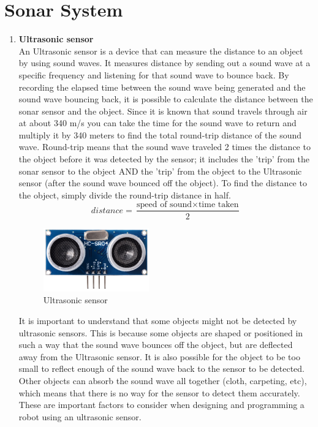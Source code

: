 \section{Sonar System}
	\begin{enumerate}
		\item \textbf{Ultrasonic sensor}\\
		An Ultrasonic sensor is a device that can measure the distance to an object by using sound waves. 
		It measures distance by sending out a sound wave at a specific frequency and listening for that sound wave to bounce back. 
		By recording the elapsed time between the sound wave being generated and the sound wave bouncing back, it is possible to calculate the distance between the sonar sensor and the object.
		Since it is known that sound travels through air at about 340 m/s you can take the time for the sound wave to return and multiply it by 340 meters to find the total round-trip distance of the sound wave. 
		Round-trip means that the sound wave traveled 2 times the distance to the object before it was detected by the sensor; it includes the 'trip' from the sonar sensor to the object AND the 'trip' from the object to the Ultrasonic sensor (after the sound wave bounced off the object).
		To find the distance to the object, simply divide the round-trip distance in half.
		\begin{equation*}
        distance = \frac{\text{speed of sound} \times \text{time taken}}{2}
        \end{equation*}
        \begin{figure}[H]
            \centering
            \includegraphics[width=0.43\textwidth]{figures/ultra}
            \caption{Ultrasonic sensor}
            \label{Fig:ultrasonic}
        \end{figure}
		It is important to understand that some objects might not be detected by ultrasonic sensors. 
		This is because some objects are shaped or positioned in such a way that the sound wave bounces off the object, but are deflected away from the Ultrasonic sensor. 
		It is also possible for the object to be too small to reflect enough of the sound wave back to the sensor to be detected.
		Other objects can absorb the sound wave all together (cloth, carpeting, etc), which means that there is no way for the sensor to detect them accurately. 
		These are important factors to consider when designing and programming a robot using an ultrasonic sensor.


\end{enumerate}
